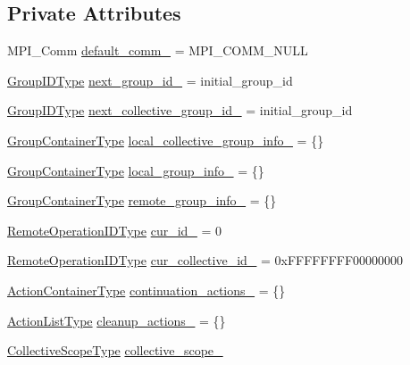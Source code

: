 \subsection*{Private Attributes}
\begin{DoxyCompactItemize}
\item 
M\+P\+I\+\_\+\+Comm \hyperlink{structvt_1_1group_1_1_group_manager_a2f40ded22e7e9bde566dffcbdff10ded}{default\+\_\+comm\+\_\+} = M\+P\+I\+\_\+\+C\+O\+M\+M\+\_\+\+N\+U\+LL
\item 
\hyperlink{namespacevt_1_1group_a805a6643787ae841525c371fd0cefeb3}{Group\+I\+D\+Type} \hyperlink{structvt_1_1group_1_1_group_manager_ad14079e35fc22c1ddc8627f4f8bd2ffe}{next\+\_\+group\+\_\+id\+\_\+} = initial\+\_\+group\+\_\+id
\item 
\hyperlink{namespacevt_1_1group_a805a6643787ae841525c371fd0cefeb3}{Group\+I\+D\+Type} \hyperlink{structvt_1_1group_1_1_group_manager_a4e15169e16bc0c8d6fa1dd440c386e1b}{next\+\_\+collective\+\_\+group\+\_\+id\+\_\+} = initial\+\_\+group\+\_\+id
\item 
\hyperlink{structvt_1_1group_1_1_group_manager_a9e2a0989865f4097bb5edd390865555e}{Group\+Container\+Type} \hyperlink{structvt_1_1group_1_1_group_manager_a496d3a98cb37579f93815d4723c627f5}{local\+\_\+collective\+\_\+group\+\_\+info\+\_\+} = \{\}
\item 
\hyperlink{structvt_1_1group_1_1_group_manager_a9e2a0989865f4097bb5edd390865555e}{Group\+Container\+Type} \hyperlink{structvt_1_1group_1_1_group_manager_a90f8d0d19ae71493e3ef0f25cc33dc70}{local\+\_\+group\+\_\+info\+\_\+} = \{\}
\item 
\hyperlink{structvt_1_1group_1_1_group_manager_a9e2a0989865f4097bb5edd390865555e}{Group\+Container\+Type} \hyperlink{structvt_1_1group_1_1_group_manager_a970a1f928ab59533e256a30f1426ccee}{remote\+\_\+group\+\_\+info\+\_\+} = \{\}
\item 
\hyperlink{namespacevt_1_1group_a73f2624ddeb535b39a08b6524f26b244}{Remote\+Operation\+I\+D\+Type} \hyperlink{structvt_1_1group_1_1_group_manager_a3926aff931a66b46bcb1f4d2266986e4}{cur\+\_\+id\+\_\+} = 0
\item 
\hyperlink{namespacevt_1_1group_a73f2624ddeb535b39a08b6524f26b244}{Remote\+Operation\+I\+D\+Type} \hyperlink{structvt_1_1group_1_1_group_manager_aaa0fcab1d59372a1535f3b626a05db8a}{cur\+\_\+collective\+\_\+id\+\_\+} = 0x\+F\+F\+F\+F\+F\+F\+F\+F00000000
\item 
\hyperlink{structvt_1_1group_1_1_group_manager_af722b277e2ad6a8dacdfec0184cd8f2f}{Action\+Container\+Type} \hyperlink{structvt_1_1group_1_1_group_manager_a39b9b401f406e473eb073d59fb186e2c}{continuation\+\_\+actions\+\_\+} = \{\}
\item 
\hyperlink{structvt_1_1group_1_1_group_manager_a48b2dd05bbdda19c5d6195b8932a2716}{Action\+List\+Type} \hyperlink{structvt_1_1group_1_1_group_manager_a0b610e2592c927cbcd932322b4bde808}{cleanup\+\_\+actions\+\_\+} = \{\}
\item 
\hyperlink{structvt_1_1group_1_1_group_manager_a376be92b957fb33ac9b855f6d134ca6a}{Collective\+Scope\+Type} \hyperlink{structvt_1_1group_1_1_group_manager_a9d158b1541d5123ccbdecbfa7ce95dc1}{collective\+\_\+scope\+\_\+}
\end{DoxyCompactItemize}
